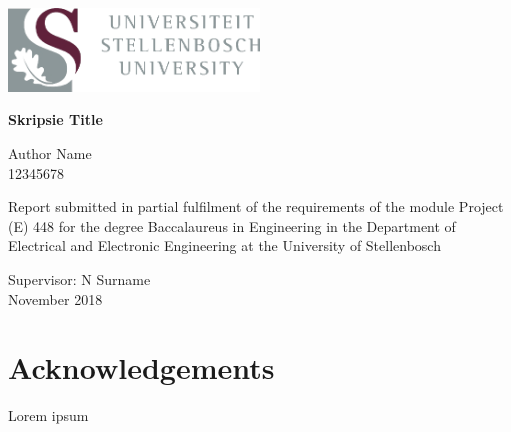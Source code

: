 \documentclass[a4paper,12pt]{report}
\author{Johan B. Ubbink \\ 18977588}
\begin{document}
\begin{titlepage}
    \begin{center}
        \includegraphics[width=0.5\textwidth]{university.png}
        \vspace*{3cm}
        
        \textbf{{\huge Skripsie Title}}
        
        
        \vfill
        
        {\large Author Name \\ 12345678} \\
        
        
        
        
        \vfill
        
        Report submitted in partial fulfilment of the requirements of the module Project (E) 448 for the degree Baccalaureus in Engineering in the Department of Electrical and Electronic Engineering at the University of Stellenbosch
        
        \vspace{2cm}
        \large{Supervisor: N Surname \\}
        \vspace{2cm}
        \large {November 2018}
        
    \end{center}
\end{titlepage}

%



\chapter*{Acknowledgements}
Lorem ipsum

\newpage
\end{document}
